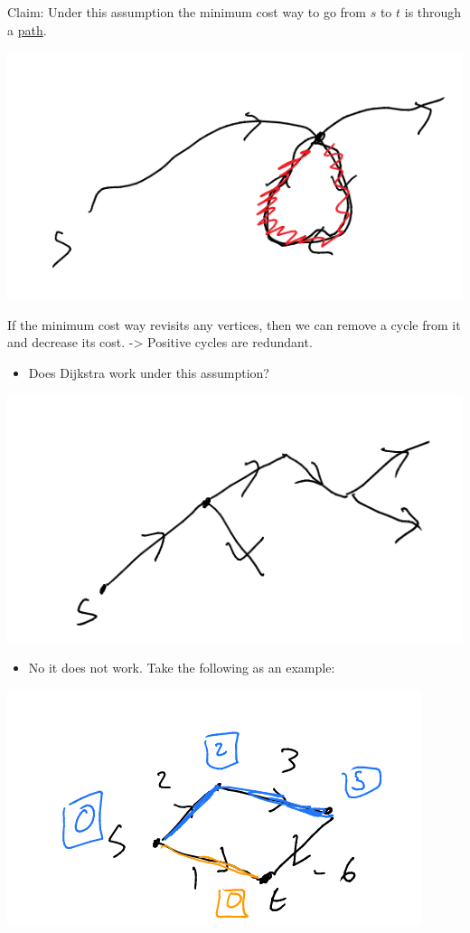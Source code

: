 \documentclass[11pt]{article}
\begin{document}
Claim: Under this assumption the minimum cost way to go from \(s\) to \(t\) is through a \uline{path}.
\begin{center}
\includegraphics[width=.9\linewidth]{./Images/i94.png}
\end{center}
If the minimum cost way revisits any vertices, then we can remove a cycle from it and decrease its cost. -> Positive cycles are redundant.
\begin{itemize}
\item Does Dijkstra work under this assumption?
\end{itemize}
\begin{center}
\includegraphics[width=.9\linewidth]{./Images/i95.png}
\end{center}
\begin{itemize}
\item No it does not work. Take the following as an example:
\end{itemize}
\begin{center}
\includegraphics[width=.9\linewidth]{./Images/i96.png}
\end{center}
\end{document}
